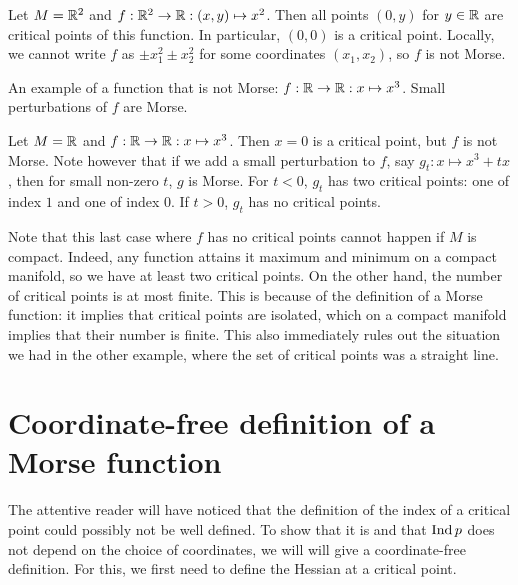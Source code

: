 \begin{noneg}
    Let $M = \mathbb{R}^2$ and $f: \mathbb{R}^2 \to  \mathbb{R}: (x, y) \mapsto  x^2$.
    Then all points $(0, y)$ for  $y \in \mathbb{R}$ are critical points of this function.
    In particular, $(0, 0)$ is a critical point. Locally, we cannot write $f$ as  $ \pm x_1^2 \pm x_2^2$ for some coordinates $(x_1, x_2)$, so $f$ is not Morse.
\end{noneg}
\begin{marginfigure}
    \centering
    \caption{}
    \label{fig:non-example-of-morse-function}
\end{marginfigure}
\begin{marginfigure}
    \centering
    \caption{An example of a function that is not Morse: $f: \mathbb{R} \to  \mathbb{R}: x \mapsto  x^3$.
        Small perturbations of $f$ are Morse.
    }
    \label{fig:non-examples-of-morse-functions}
\end{marginfigure}
\begin{noneg}
    Let $M = \mathbb{R}$ and $f : \mathbb{R} \to  \mathbb{R}: x \mapsto x^3$.
    Then $x = 0$ is a critical point, but $f$ is not Morse.
    Note however that if we add a small perturbation to $f$, say $g_t: x\mapsto x^3+ tx$, then for small non-zero $t$, $g$ is Morse. For $t < 0$, $g_t$  has two critical points: one of index $1$ and one of index $0$.
    If $t > 0$,  $g_t$ has no critical points.
\end{noneg}

Note that this last case where $f$ has no critical points cannot happen if $M$ is compact.
Indeed, any function attains it maximum and minimum on a compact manifold, so we have at least two critical points.
On the other hand, the number of critical points is at most finite.
This is because of the definition of a Morse function: it implies that critical points are isolated, which on a compact manifold implies that their number is finite.
This also immediately rules out the situation we had in the other example, where the set of critical points was a straight line.

\section{Coordinate-free definition of a Morse function}

The attentive reader will have noticed that the definition of the index of a critical point could possibly not be well defined.
To show that it is and that $\operatorname{Ind} p$ does not depend on the choice of coordinates, we will will give a coordinate-free definition. For this, we first need to define the Hessian at a critical point.

